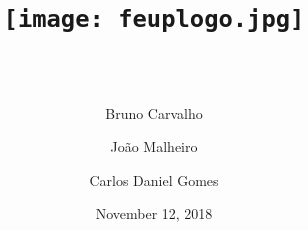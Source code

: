 \documentclass[11pt,a4paper,portrait,titlepage]{article}
\title{
	\texttt{[image: feuplogo.jpg]}\\
	{\Huge \maintitle{}}\\
	{\large \subtitle{}}
}
\date{November 12, 2018}
\author{
	Bruno Carvalho\\\text{up201606517}
	\and
	João Malheiro\\\text{up201605926}
	\and
	Carlos Daniel Gomes\\\text{up201603404}
}
\begin{document}
\begin{titlepage}
\maketitle
\tableofcontents
\thispagestyle{empty}
\end{titlepage}


\clearpage


\clearpage

\printbibliography
\end{document}

